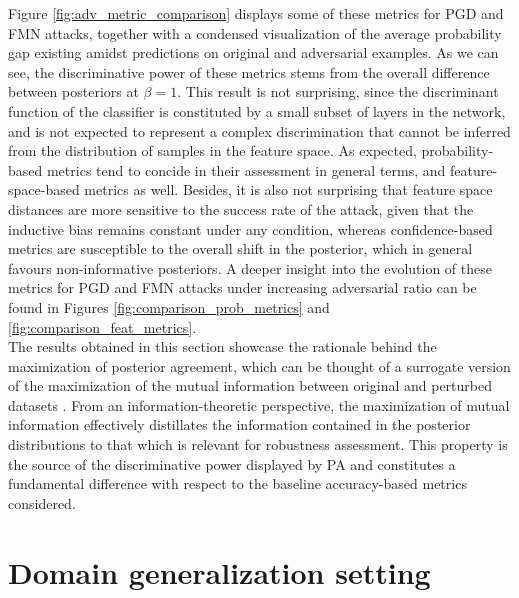 Figure \ref{fig:adv_metric_comparison} displays some of these metrics for
PGD and FMN attacks, together with a condensed visualization of the average 
probability gap existing amidst predictions on original and adversarial examples. As
we can see, the discriminative power of these metrics stems from the overall difference 
between posteriors at $\beta = 1$. This result is not surprising, since the discriminant function 
of the classifier is constituted by a small subset of layers in the network, and is not expected 
to represent a complex discrimination that cannot be inferred from the distribution 
of samples in the feature space. As expected, probability-based metrics tend to concide in 
their assessment in general terms, and feature-space-based metrics as well. Besides, it is also not
surprising that feature space distances are more sensitive to the success rate of the attack, 
given that the inductive bias remains constant under any condition, whereas confidence-based metrics
are susceptible to the overall shift in the posterior, which in general favours non-informative
posteriors. A deeper insight into the evolution of these metrics for PGD and FMN attacks under increasing
adversarial ratio can be found in Figures \ref{fig:comparison_prob_metrics} and 
\ref{fig:comparison_feat_metrics}. \\

The results obtained in this section showcase the rationale behind the maximization of posterior
agreement, which can be thought of a surrogate version of the maximization of the mutual information
between original and perturbed datasets
\cite{buhmannDataScienceAlgorithms2022}. From an information-theoretic perspective, 
the maximization of mutual information effectively
distillates the information contained in the posterior distributions to that 
which is relevant for robustness assessment. This property is the source of the 
discriminative power displayed by PA and constitutes a fundamental difference
with respect to the baseline accuracy-based metrics considered.


\section{Domain generalization setting}\label{results_domain_generalization}

